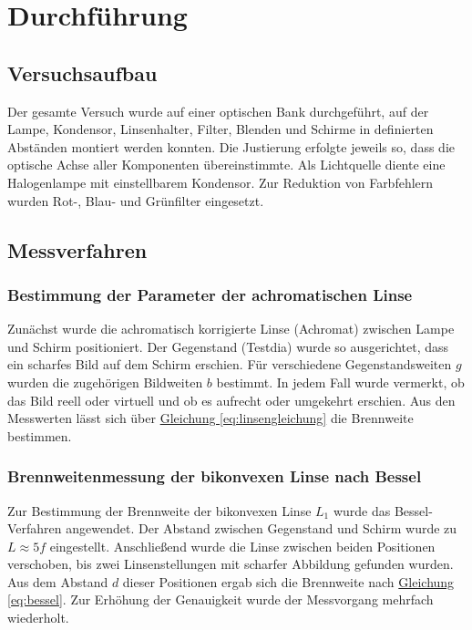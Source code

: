 \chapter{Durchführung}
\label{ch:durchfuerung}

\section{Versuchsaufbau}

Der gesamte Versuch wurde auf einer optischen Bank durchgeführt, auf der Lampe, Kondensor, Linsenhalter, Filter, Blenden und Schirme in definierten Abständen montiert werden konnten. Die Justierung erfolgte jeweils so, dass die optische Achse aller Komponenten übereinstimmte. Als Lichtquelle diente eine Halogenlampe mit einstellbarem Kondensor. Zur Reduktion von Farbfehlern wurden Rot-, Blau- und Grünfilter eingesetzt.

\section{Messverfahren}

\subsection{Bestimmung der Parameter der achromatischen Linse}

Zunächst wurde die achromatisch korrigierte Linse (Achromat) zwischen Lampe und Schirm positioniert. Der Gegenstand (Testdia) wurde so ausgerichtet, dass ein scharfes Bild auf dem Schirm erschien. Für verschiedene Gegenstandsweiten $g$ wurden die zugehörigen Bildweiten $b$ bestimmt. In jedem Fall wurde vermerkt, ob das Bild reell oder virtuell und ob es aufrecht oder umgekehrt erschien. Aus den Messwerten lässt sich über \hyperref[eq:linsengleichung]{Gleichung \ref*{eq:linsengleichung}} die Brennweite bestimmen.

\subsection{Brennweitenmessung der bikonvexen Linse nach Bessel}

Zur Bestimmung der Brennweite der bikonvexen Linse $L_1$ wurde das Bessel-Verfahren angewendet. Der Abstand zwischen Gegenstand und Schirm wurde zu $L \approx 5f$ eingestellt. Anschließend wurde die Linse zwischen beiden Positionen verschoben, bis zwei Linsenstellungen mit scharfer Abbildung gefunden wurden. Aus dem Abstand $d$ dieser Positionen ergab sich die Brennweite nach \hyperref[eq:bessel]{Gleichung \ref*{eq:bessel}}. Zur Erhöhung der Genauigkeit wurde der Messvorgang mehrfach wiederholt.

